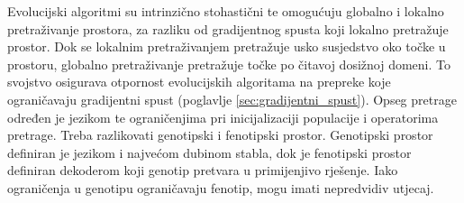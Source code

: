 \documentclass[times, utf8, numeric, diplomski]{fer}
\def\secref#1{(poglavlje \ref{#1})}
\begin{document}
Evolucijski algoritmi su intrinzično stohastični te omogućuju globalno i lokalno pretraživanje prostora, za razliku od gradijentnog spusta koji lokalno pretražuje prostor. Dok se lokalnim pretraživanjem pretražuje usko susjedstvo oko točke u prostoru, globalno pretraživanje pretražuje točke po čitavoj dosižnoj domeni. To svojstvo osigurava otpornost evolucijskih algoritama na prepreke koje ograničavaju gradijentni spust \secref{sec:gradijentni_spust}. Opseg pretrage određen je jezikom te ograničenjima pri inicijalizaciji populacije i operatorima pretrage. Treba razlikovati genotipski i fenotipski prostor. Genotipski prostor definiran je jezikom i najvećom dubinom stabla, dok je fenotipski prostor definiran dekoderom koji genotip pretvara u primijenjivo rješenje. Iako ograničenja u genotipu ograničavaju fenotip, mogu imati nepredvidiv utjecaj.
\end{document}
